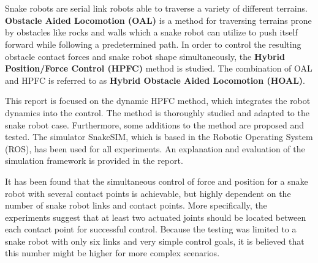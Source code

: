 \chapter{\abstractname}


Snake robots are serial link robots able to traverse a variety of different terrains. 
\textbf{Obstacle Aided Locomotion (OAL)} is a method for traversing terrains prone by obstacles like rocks and walls which a snake robot can utilize to push itself forward while following a predetermined path. In order to control the resulting obstacle contact forces and snake robot shape simultaneously, the \textbf{Hybrid Position/Force Control (HPFC)} method is studied. The combination of OAL and HPFC is referred to as \textbf{Hybrid Obstacle Aided Locomotion (HOAL)}.

This report is focused on the dynamic HPFC method, which integrates the robot dynamics into the control. The method is thoroughly studied and adapted to the snake robot case. Furthermore, some additions to the method are proposed and tested. 
The simulator SnakeSIM, which is based in the Robotic Operating System (ROS), has been used for all experiments. An explanation and evaluation of the simulation framework is provided in the report.

It has been found that the simultaneous control of force and position for a snake robot with several contact points is achievable, but highly dependent on the number of snake robot links and contact points. More specifically, the experiments suggest that at least two actuated joints should be located between each contact point for successful control. Because the testing was limited to a snake robot with only six links and very simple control goals, it is believed that this number might be higher for more complex scenarios.




\makeatletter
{}


\makeatother







